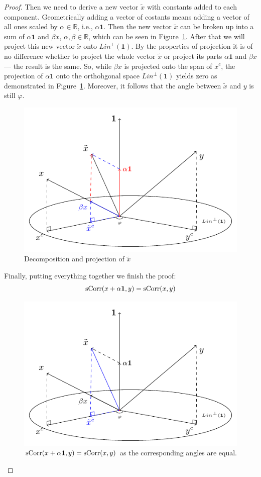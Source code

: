 \begin{proof}
Then we need to derive a new vector $\tilde x$ with constants added to each component.
Geometrically adding a vector of costants means adding a vector of all ones
scaled by $\alpha \in \mathbb{R}$, i.e., $\alpha \mathbf{1}$.
Then the new vector $\tilde x$ can be broken up into a sum of $\alpha \mathbf{1}$ and
$\beta x$, $\alpha, \beta \in \mathbb{R}$, which can be seen in Figure~\ref{fig:corr_tildex}.
After that we will project this new vector $\tilde x$ onto $Lin^{\perp}(\mathbf{1})$.
By the properties of projection it is of no difference whether to project
the whole vector $\tilde x$ or project its parts $\alpha \mathbf{1}$
and $\beta x$ — the result is the same.
So, while $\beta x$ is projected onto the span of $x^c$, the projection of $\alpha \mathbf{1}$
onto the orthohgonal space $Lin^{\perp}(\mathbf{1})$ yields zero as demonstrated
in Figure~\ref{fig:corr_tildex}.
Moreover, it follows that the angle between $\tilde x$ and $y$ is still $\varphi$.

\begin{figure}
  \centering
  \includegraphics[width=0.6\linewidth]{figures/02_correlation_constant_decomposition.pdf}
  \caption{Decomposition and projection of $\tilde x$}
  \label{fig:corr_tildex}
\end{figure}

Finally, putting everything together we finish the proof:
\[
\operatorname{sCorr}(x + \alpha \mathbf{1}, y) = \operatorname{sCorr}(x,y)
\]

\begin{figure}
  \centering
  \includegraphics[width=0.6\linewidth]{figures/02_correlation_constant_proof.pdf}
  \caption{$\operatorname{sCorr}(x + \alpha \mathbf{1}, y) = \operatorname{sCorr}(x,y)$ as the corresponding angles are equal.}
  \label{fig:corr_final}
\end{figure}
\end{proof}


